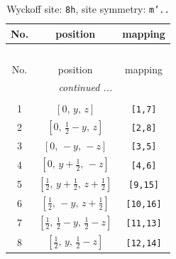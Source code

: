 \documentclass[fleqn,8pt]{jsarticle}
\begin{document}
\begin{longtable}{ccc}
\caption{Wyckoff site: {\tt 8h}, site symmetry: {\tt m'..}}
 \\
 \hline \hline
No. & position & mapping \\ \hline \endfirsthead

\multicolumn{2}{l}{\tablename\ \thetable{}} \\
 \hline \hline
No. & position & mapping \\ \hline \endhead

 \hline \hline
\multicolumn{2}{r}{\footnotesize\it continued ...} \\ \endfoot

 \hline \hline
\multicolumn{2}{r}{} \\ \endlastfoot

1 & $\left[ 0,\, y,\, z \right]$ & {\tt [1,7]} \\ \hline
2 & $\left[ 0,\, \frac{1}{2} - y,\, z \right]$ & {\tt [2,8]} \\ \hline
3 & $\left[ 0,\, - y,\, - z \right]$ & {\tt [3,5]} \\ \hline
4 & $\left[ 0,\, y + \frac{1}{2},\, - z \right]$ & {\tt [4,6]} \\ \hline
5 & $\left[ \frac{1}{2},\, y + \frac{1}{2},\, z + \frac{1}{2} \right]$ & {\tt [9,15]} \\ \hline
6 & $\left[ \frac{1}{2},\, - y,\, z + \frac{1}{2} \right]$ & {\tt [10,16]} \\ \hline
7 & $\left[ \frac{1}{2},\, \frac{1}{2} - y,\, \frac{1}{2} - z \right]$ & {\tt [11,13]} \\ \hline
8 & $\left[ \frac{1}{2},\, y,\, \frac{1}{2} - z \right]$ & {\tt [12,14]} \\
\end{longtable}
\renewcommand{\arraystretch}{1.2}
\end{document}
